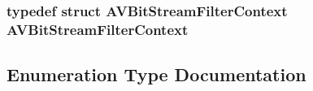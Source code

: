 \subsubsection[{\texorpdfstring{A\+V\+Bit\+Stream\+Filter\+Context}{AVBitStreamFilterContext}}]{\setlength{\rightskip}{0pt plus 5cm}typedef struct {\bf A\+V\+Bit\+Stream\+Filter\+Context}  {\bf A\+V\+Bit\+Stream\+Filter\+Context}}\hypertarget{group__lavc__misc_ga2ab47771ac6385c834d0fb0bac71b609}{}\label{group__lavc__misc_ga2ab47771ac6385c834d0fb0bac71b609}


\subsection{Enumeration Type Documentation}
